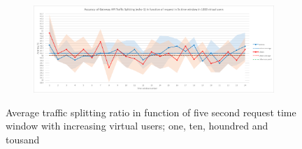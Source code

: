 \begin{figure}[H]
    \vspace{-0.1cm} %

    \begin{subfigure}[b]{0.8\textwidth}
        \includegraphics[width=\textwidth]{plots/traffic-splitting/time_window_5_1000vu_cloud.png}
        \label{fig:time_window_1000vu}
    \end{subfigure}

    \vspace{-0.3cm} %

    \caption{Average traffic splitting ratio in function of five second request time window with increasing virtual users; one, ten, houndred and tousand}
    \label{fig:avg_vus}
\end{figure}








